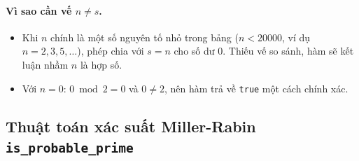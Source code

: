 \paragraph{Vì sao cần vế $n \neq s$.}
\begin{itemize}
  \item Khi $n$ chính là một số nguyên tố nhỏ trong bảng ($n < 20000$, ví dụ $n = 2, 3, 5, \dots$), phép chia với $s = n$ cho số dư $0$. Thiếu vế so sánh, hàm sẽ kết luận nhầm $n$ là hợp số.
  \item Với $n = 0$: $0 \bmod 2 = 0$ và $0 \neq 2$, nên hàm trả về \texttt{true} một cách chính xác.
\end{itemize}

\subsection{Thuật toán xác suất Miller-Rabin \texttt{is\_probable\_prime}}

